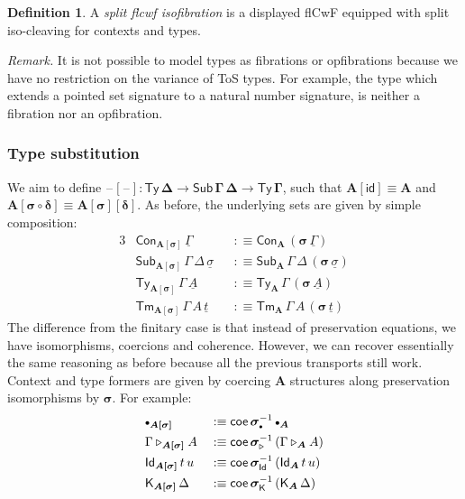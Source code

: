 \documentclass[12pt,a4paper,twoside,openany]{book}
\theoremstyle{remark}
\theoremstyle{definition}
\newtheorem{mydefinition}{Definition}
\theoremstyle{theorem}
\newcommand{\bs}[1]{\boldsymbol{#1}}
\newcommand{\id}{\mathsf{id}}
\newcommand{\Con}{\mathsf{Con}}
\newcommand{\Sub}{\mathsf{Sub}}
\newcommand{\Tm}{\mathsf{Tm}}
\newcommand{\Ty}{\mathsf{Ty}}
\newcommand{\Id}{\mathsf{Id}}
\newcommand{\blank}{\mathord{\hspace{1pt}\text{--}\hspace{1pt}}}
\newcommand{\ra}{\rightarrow}
\newcommand{\ext}{\triangleright}
\newcommand{\emptycon}{\scaleobj{.75}\bullet}
\newcommand{\K}{\mathsf{K}}
\newcommand{\bsigma}{\bs{\sigma}}
\newcommand{\bA}{\bs{A}}
\newcommand{\ul}[1]{\underline{#1}}
\newcommand{\ulGamma}{\ul{\Gamma}}
\newcommand{\ulsigma}{\ul{\sigma}}
\newcommand{\ult}{\ul{t}}
\newcommand{\ulA}{\ul{A}}
\newcommand{\coe}{\mathsf{coe}}
\newcommand{\defn}{:\equiv}
\begin{document}
\begin{mydefinition} A \emph{split flcwf isofibration} is a displayed flCwF equipped with split iso-cleaving for contexts and types.
\end{mydefinition}

\emph{Remark.} It is not possible to model types as fibrations or opfibrations
because we have no restriction on the variance of ToS types. For example, the
type which extends a pointed set signature to a natural number signature, is
neither a fibration nor an opfibration.

\subsubsection{Type substitution}
We aim to define $\bs{\blank[\blank] : \Ty\,\Delta \ra \Sub\,\Gamma\,\Delta \ra
  \Ty\,\Gamma}$, such that $\bs{A[\id]} \equiv \bA$ and $\bs{A[\sigma\circ\delta]} \equiv
\bs{A[\sigma][\delta]}$. As before, the underlying sets are given by simple
composition:
\begin{alignat*}{3}
  & \Con_{\bs{A[\sigma]}}\,\ulGamma && \defn \Con_{\bA}\,(\bsigma\,\ulGamma)\\
  & \Sub_{\bs{A[\sigma]}}\,\Gamma\,\Delta\,\ulsigma && \defn
    \Sub_{\bA}\,\Gamma\,\Delta\,(\bsigma\,\ulsigma)\\
  & \Ty_{\bs{A[\sigma]}}\,\Gamma\,\ulA && \defn
      \Ty_{\bA}\,\Gamma\,(\bsigma\,\ulA)\\
  & \Tm_{\bs{A[\sigma]}}\,\Gamma\,A\,\ult && \defn
      \Tm_{\bA}\,\Gamma\,A\,(\bsigma\,\ult)
\end{alignat*}
The difference from the finitary case is that instead of preservation equations,
we have isomorphisms, coercions and coherence. However, we can recover
essentially the same reasoning as before because all the previous transports
still work. Context and type formers are given by coercing $\bA$ structures
along preservation isomorphisms by $\bsigma$. For example:
\begin{alignat*}{3}
  &\emptycon_{\bs{A[\sigma]}} && \defn
    \coe\,\bsigma_{\emptycon}^{-1}\,\emptycon_{\bA}\\
  &\Gamma\ext_{\bs{A[\sigma]}}A && \defn
    \coe\,\bsigma_{\ext}^{-1}\,(\Gamma\ext_{\bA} A)\\
  &\Id_{\bs{A[\sigma]}}\,t\,u && \defn
    \coe\,\bsigma_{\Id}^{-1}\,(\Id_{\bA}\,t\,u)\\
  &\K_{\bs{A[\sigma]}}\,\Delta && \defn
    \coe\,\bsigma_{\K}^{-1}\,(\K_{\bA}\,\Delta)
\end{alignat*}
\end{document}
